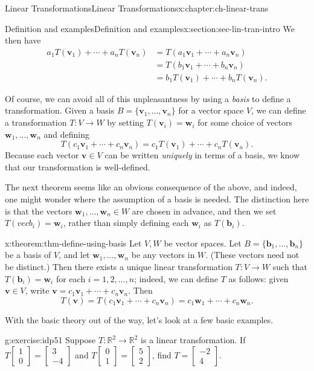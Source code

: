 \documentclass[oneside,10pt,]{book}
\numberwithin{equation}{section}
\newcommand{\bbm}{\begin{bmatrix}}
\newcommand{\ebm}{\end{bmatrix}}
\newcommand{\R}{\mathbb{R}}
\newcommand{\vv}{\mathbf{v}}
\newcommand{\ww}{\mathbf{w}}
\newcommand{\amp}{&}
\begin{document}
\begin{chapterptx}{Linear Transformations}{}{Linear Transformations}{}{}{x:chapter:ch-linear-trans}
\begin{sectionptx}{Definition and examples}{}{Definition and examples}{}{}{x:section:sec-lin-tran-intro}
We then have%
\begin{align*}
a_1T(\vv_1)+\cdots + a_nT(\vv_n) \amp =T(a_1\vv_1+\cdots + a_n\vv_n) \\
\amp =T(b_1\vv_1+\cdots +b_n\vv_n)\\
\amp =b_1T(\vv_1)+\cdots +b_nT(\vv_n)\text{.}
\end{align*}
%
\par
Of course, we can avoid all of this unpleasantness by using a \emph{basis} to define a transformation. Given a basis \(B = \{\vv_1,\ldots, \vv_n\}\) for a vector space \(V\), we can define a transformation \(T:V\to W\) by setting \(T(\vv_i)=\ww_i\) for some choice of vectors \(\ww_1,\ldots, \ww_n\) and defining%
\begin{equation*}
T(c_1\vv_1+\cdots +c_n\vv_n)=c_1T(\vv_1)+\cdots + c_nT(\vv_n)\text{.}
\end{equation*}
Because each vector \(\vv\in V\) can be written \emph{uniquely} in terms of a basis, we know that our transformation is well-defined.%
\par
The next theorem seems like an obvious consequence of the above, and indeed, one might wonder where the assumption of a basis is needed. The distinction here is that the vectors \(\ww_1,\ldots, \ww_n\in W\) are chosen in advance, and then we set \(T(vec{b}_i)=\ww_i\), rather than simply defining each \(\ww_i\) as \(T(\mathbf{b}_i)\).%
\begin{theorem}{}{}{x:theorem:thm-define-using-basis}%
Let \(V,W\) be vector spaces. Let \(B=\{\mathbf{b}_1,\ldots, \mathbf{b}_n\}\) be a basis of \(V\), and let \(\ww_1,\ldots, \ww_n\) be any vectors in \(W\). (These vectors need not be distinct.) Then there exists a unique linear transformation \(T:V\to W\) such that \(T(\mathbf{b}_i)=\ww_i\) for each \(i=1,2,\ldots, n\); indeed, we can define \(T\) as follows: given \(\vv\in V\), write \(\vv=c_1\vv_1+\cdots +c_n\vv_n\). Then%
\begin{equation*}
T(\vv)=T(c_1\vv_1+\cdots + c_n\vv_n) = c_1\ww_1+\cdots +c_n\ww_n\text{.}
\end{equation*}
%
\end{theorem}
With the basic theory out of the way, let's look at a few basic examples.%
\begin{inlineexercise}{}{g:exercise:idp51}%
Suppose \(T:\R^2\to \R^2\) is a linear transformation. If \(T\bbm 1\\0\ebm = \bbm 3\\-4\ebm\) and \(T\bbm 0\\1\ebm =\bbm 5\\2\ebm\), find \(T=\bbm -2\\4\ebm\).%

\end{inlineexercise}
\end{sectionptx}
\end{chapterptx}
\end{document}
